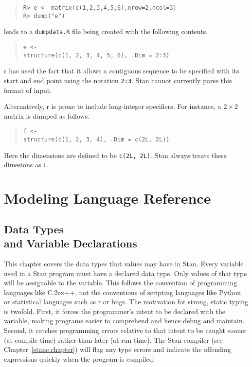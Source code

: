 \documentclass[10pt]{report}
\newcommand{\Stan}{Stan\xspace}
\newcommand*{\Cpp}{C\raise.2ex\hbox{\footnotesize ++}\xspace} %
\newcommand{\acronym}[1]{{\sc #1}\xspace}
\newcommand{\R}{\acronym{r}}
\newcommand{\BUGS}{\acronym{bugs}}
\newcommand{\code}[1]{{\tt #1}}
\newcommand{\refchapter}[1]{Chapter~\ref{#1.chapter}}
\begin{document}
\begin{quote}
\begin{Verbatim}[fontshape=sl]
R> e <- matrix(c(1,2,3,4,5,6),nrow=2,ncol=3)
R> dump("e")
\end{Verbatim}
\end{quote}
%
leads to a \code{dumpdata.R} file being created with
the following contents.
%
\begin{quote}
\begin{Verbatim}
e <-
structure(c(1, 2, 3, 4, 5, 6), .Dim = 2:3)
\end{Verbatim}
\end{quote}
%
\R has used the fact that it allows a contiguous
sequence to be specified with its start and end point
using the notation \code{2:3}.  \Stan cannot currently
parse this format of input.  

Alternatively, \R is prone to include long-integer specifiers.
For instance, a $2 \times 2$ matrix is dumped as follows.
%
\begin{quote}
\begin{Verbatim}
f <-
structure(c(1, 2, 3, 4), .Dim = c(2L, 2L))
\end{Verbatim}
\end{quote}
%
Here the dimensions are defined to be \code{c(2L,~2L)}.  \Stan 
always treats these dimesions as \code{L}.







\part{Modeling Language Reference}

\chapter{Data Types \\ and Variable Declarations}\label{data-types.chapter}

This chapter covers the data types that values may have in \Stan.
Every variable used in a \Stan program must have a declared data type.
Only values of that type will be assignable to the variable.  This
follows the convention of programming languages like \Cpp, not the
conventions of scripting languages like Python or statistical
languages such as \R or \BUGS.  The motivation for strong, static
typing is twofold.  First, it forces the programmer's intent to be
declared with the variable, making programs easier to comprehend and
hence debug and maintain.  Second, it catches programming errors
relative to that intent to be caught sooner (at compile time) rather
than later (at run time).  The \Stan compiler (see \refchapter{stanc})
will flag any type errors and indicate the offending expressions
quickly when the program is compiled.
\end{document}
